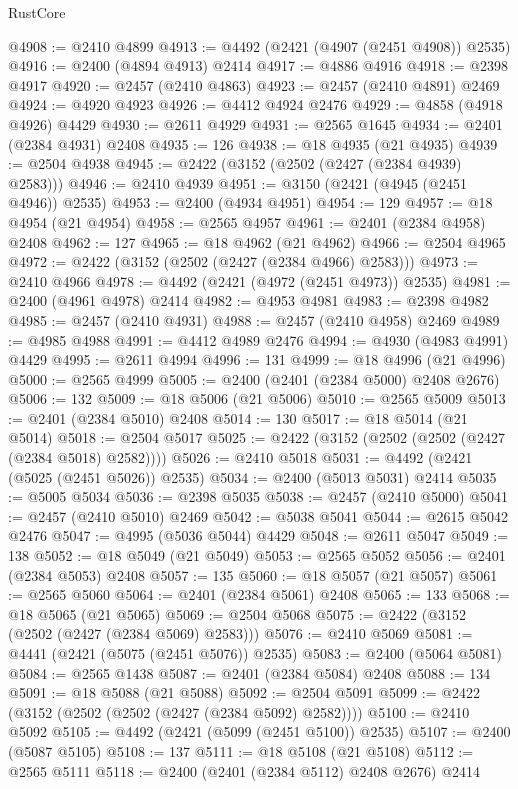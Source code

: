\begin{lexlean}{RustCore}
\begin{coremodule}
@4908 := @2410 @4899
@4913 := @4492 (@2421 (@4907 (@2451 @4908)) @2535)
@4916 := @2400 (@4894 @4913) @2414
@4917 := @4886 @4916
@4918 := @2398 @4917
@4920 := @2457 (@2410 @4863)
@4923 := @2457 (@2410 @4891) @2469
@4924 := @4920 @4923
@4926 := @4412 @4924 @2476
@4929 := @4858 (@4918 @4926) @4429
@4930 := @2611 @4929
@4931 := @2565 @1645
@4934 := @2401 (@2384 @4931) @2408
@4935 := 126
@4938 := @18 @4935 (@21 @4935)
@4939 := @2504 @4938
@4945 := @2422 (@3152 (@2502 (@2427 (@2384 @4939) @2583)))
@4946 := @2410 @4939
@4951 := @3150 (@2421 (@4945 (@2451 @4946)) @2535)
@4953 := @2400 (@4934 @4951)
@4954 := 129
@4957 := @18 @4954 (@21 @4954)
@4958 := @2565 @4957
@4961 := @2401 (@2384 @4958) @2408
@4962 := 127
@4965 := @18 @4962 (@21 @4962)
@4966 := @2504 @4965
@4972 := @2422 (@3152 (@2502 (@2427 (@2384 @4966) @2583)))
@4973 := @2410 @4966
@4978 := @4492 (@2421 (@4972 (@2451 @4973)) @2535)
@4981 := @2400 (@4961 @4978) @2414
@4982 := @4953 @4981
@4983 := @2398 @4982
@4985 := @2457 (@2410 @4931)
@4988 := @2457 (@2410 @4958) @2469
@4989 := @4985 @4988
@4991 := @4412 @4989 @2476
@4994 := @4930 (@4983 @4991) @4429
@4995 := @2611 @4994
@4996 := 131
@4999 := @18 @4996 (@21 @4996)
@5000 := @2565 @4999
@5005 := @2400 (@2401 (@2384 @5000) @2408 @2676)
@5006 := 132
@5009 := @18 @5006 (@21 @5006)
@5010 := @2565 @5009
@5013 := @2401 (@2384 @5010) @2408
@5014 := 130
@5017 := @18 @5014 (@21 @5014)
@5018 := @2504 @5017
@5025 := @2422 (@3152 (@2502 (@2502 (@2427 (@2384 @5018) @2582))))
@5026 := @2410 @5018
@5031 := @4492 (@2421 (@5025 (@2451 @5026)) @2535)
@5034 := @2400 (@5013 @5031) @2414
@5035 := @5005 @5034
@5036 := @2398 @5035
@5038 := @2457 (@2410 @5000)
@5041 := @2457 (@2410 @5010) @2469
@5042 := @5038 @5041
@5044 := @2615 @5042 @2476
@5047 := @4995 (@5036 @5044) @4429
@5048 := @2611 @5047
@5049 := 138
@5052 := @18 @5049 (@21 @5049)
@5053 := @2565 @5052
@5056 := @2401 (@2384 @5053) @2408
@5057 := 135
@5060 := @18 @5057 (@21 @5057)
@5061 := @2565 @5060
@5064 := @2401 (@2384 @5061) @2408
@5065 := 133
@5068 := @18 @5065 (@21 @5065)
@5069 := @2504 @5068
@5075 := @2422 (@3152 (@2502 (@2427 (@2384 @5069) @2583)))
@5076 := @2410 @5069
@5081 := @4441 (@2421 (@5075 (@2451 @5076)) @2535)
@5083 := @2400 (@5064 @5081)
@5084 := @2565 @1438
@5087 := @2401 (@2384 @5084) @2408
@5088 := 134
@5091 := @18 @5088 (@21 @5088)
@5092 := @2504 @5091
@5099 := @2422 (@3152 (@2502 (@2502 (@2427 (@2384 @5092) @2582))))
@5100 := @2410 @5092
@5105 := @4492 (@2421 (@5099 (@2451 @5100)) @2535)
@5107 := @2400 (@5087 @5105)
@5108 := 137
@5111 := @18 @5108 (@21 @5108)
@5112 := @2565 @5111
@5118 := @2400 (@2401 (@2384 @5112) @2408 @2676) @2414

\end{coremodule}
\end{lexlean}

